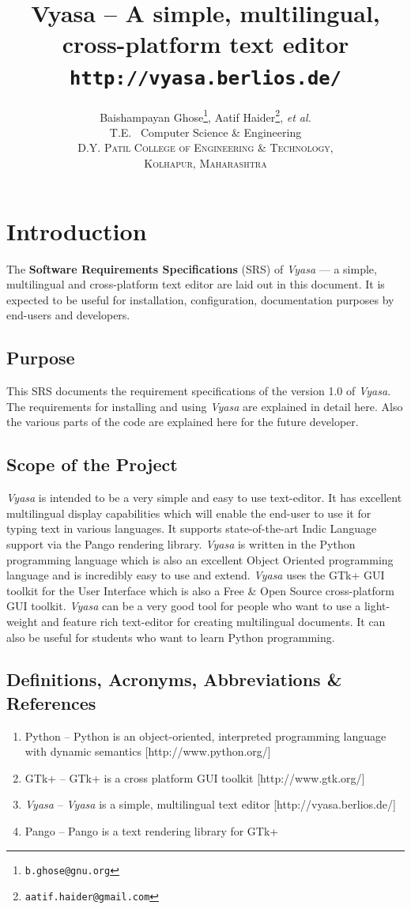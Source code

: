 \documentclass[12pt,a4paper]{article}
\title {Vyasa -- A simple, multilingual, cross-platform text editor \\ \small{\texttt{http://vyasa.berlios.de/}}}
\author {\large{Baishampayan Ghose\footnote{\texttt{b.ghose@gnu.org}},
    Aatif Haider\footnote{\texttt{aatif.haider@gmail.com}}, \textit{et
      al.}} \\\small{T.E.~ Computer Science \&{} Engineering}\\ \small{\textsc{D.Y. Patil College of Engineering \&{} Technology,}}
\\ \small{\textsc{Kolhapur, Maharashtra}}}
\newcommand{\VS}{\textit{Vyasa}}
\begin{document}
\maketitle
\tableofcontents
\listoffigures
\newpage
\section{Introduction}
The {\bfseries Software Requirements Specifications} (SRS) of
\VS{} --- a simple, multilingual and cross-platform text editor
are laid out in this document. It is expected to be useful for
installation, configuration, documentation purposes by end-users and developers.

\subsection{Purpose}
This SRS documents the requirement specifications of the version 1.0 of
\VS. The requirements for installing and using \VS{} are explained in
detail here. Also the various parts of the code are explained here for
the future developer.

\subsection{Scope of the Project}
\VS{} is intended to be a very simple and easy to use text-editor. It
has excellent multilingual display capabilities which will enable the
end-user to use it for typing text in various languages. It supports
state-of-the-art Indic Language support via the Pango rendering
library. \VS{} is written in the Python programming language which is
also an excellent Object Oriented programming language and is incredibly
easy to use and extend. \VS{} uses the GTk+ GUI toolkit for the User
Interface which is also a Free \&{} Open Source cross-platform GUI
toolkit.
\VS{} can be a very good tool for people who want to use a light-weight
and feature rich text-editor for creating multilingual documents. It can
also be useful for students who want to learn Python programming.

\subsection{Definitions, Acronyms, Abbreviations \&{} References}
\begin{enumerate}
\item Python -- Python is an object-oriented, interpreted programming
  language with dynamic semantics [http://www.python.org/]
\item GTk+ -- GTk+ is a cross platform GUI toolkit [http://www.gtk.org/]
\item \VS{} -- \VS{} is a simple, multilingual text editor
  [http://vyasa.berlios.de/]
\item Pango -- Pango is a text rendering library for GTk+
\end{enumerate}
\end{document}
